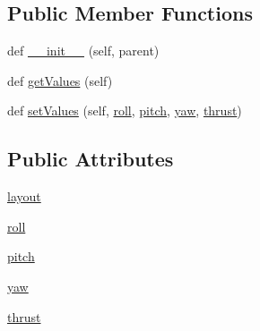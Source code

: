 \subsection*{Public Member Functions}
\begin{DoxyCompactItemize}
\item 
def \mbox{\hyperlink{classwindshape_1_1gui_1_1widgets_1_1tabs_1_1_attitude_widget_1_1_attitude_widget_a32fc63cd4831a3fec5e1423dc8588577}{\+\_\+\+\_\+init\+\_\+\+\_\+}} (self, parent)
\item 
def \mbox{\hyperlink{classwindshape_1_1gui_1_1widgets_1_1tabs_1_1_attitude_widget_1_1_attitude_widget_aed905a1f7fe2b4560050688d79a6438e}{get\+Values}} (self)
\item 
def \mbox{\hyperlink{classwindshape_1_1gui_1_1widgets_1_1tabs_1_1_attitude_widget_1_1_attitude_widget_aeb5c6dd6a8f5edf4eeb8787926524978}{set\+Values}} (self, \mbox{\hyperlink{classwindshape_1_1gui_1_1widgets_1_1tabs_1_1_attitude_widget_1_1_attitude_widget_a84d89ec27a220a25b86bd09182743956}{roll}}, \mbox{\hyperlink{classwindshape_1_1gui_1_1widgets_1_1tabs_1_1_attitude_widget_1_1_attitude_widget_a3d8e45fda3f0e476e772fe5f6e91d862}{pitch}}, \mbox{\hyperlink{classwindshape_1_1gui_1_1widgets_1_1tabs_1_1_attitude_widget_1_1_attitude_widget_a387ae857c38d374464dd5330f93e274a}{yaw}}, \mbox{\hyperlink{classwindshape_1_1gui_1_1widgets_1_1tabs_1_1_attitude_widget_1_1_attitude_widget_ad4e7cade5910d518cff3c9c739d1e2d1}{thrust}})
\end{DoxyCompactItemize}
\subsection*{Public Attributes}
\begin{DoxyCompactItemize}
\item 
\mbox{\hyperlink{classwindshape_1_1gui_1_1widgets_1_1tabs_1_1_attitude_widget_1_1_attitude_widget_a1d5601671057c9ad66935c190acfc28a}{layout}}
\item 
\mbox{\hyperlink{classwindshape_1_1gui_1_1widgets_1_1tabs_1_1_attitude_widget_1_1_attitude_widget_a84d89ec27a220a25b86bd09182743956}{roll}}
\item 
\mbox{\hyperlink{classwindshape_1_1gui_1_1widgets_1_1tabs_1_1_attitude_widget_1_1_attitude_widget_a3d8e45fda3f0e476e772fe5f6e91d862}{pitch}}
\item 
\mbox{\hyperlink{classwindshape_1_1gui_1_1widgets_1_1tabs_1_1_attitude_widget_1_1_attitude_widget_a387ae857c38d374464dd5330f93e274a}{yaw}}
\item 
\mbox{\hyperlink{classwindshape_1_1gui_1_1widgets_1_1tabs_1_1_attitude_widget_1_1_attitude_widget_ad4e7cade5910d518cff3c9c739d1e2d1}{thrust}}
\end{DoxyCompactItemize}


